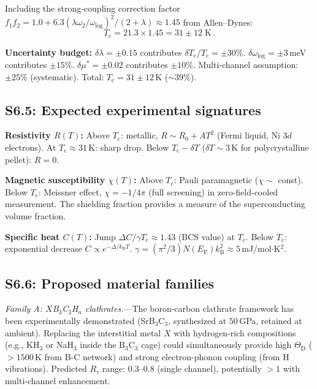 \documentclass[prb,twocolumn,superscriptaddress,longbibliography,floatfix]{revtex4-2}
\newcommand{\kB}{k_{\mathrm{B}}}
\newcommand{\tauasym}{\tau}
\newcommand{\Rtau}{R_{\tauasym}}
\newcommand{\Tc}{T_{\mathrm{c}}}
\newcommand{\EF}{E_{\mathrm{F}}}
\newcommand{\ThetaD}{\Theta_{\mathrm{D}}}
\begin{document}
Including the strong-coupling correction factor
$f_1 f_2 = 1.0 + 6.3(\lambda\omega_2/\omega_{\log})^2/(2+\lambda)
\approx 1.45$ from Allen--Dynes:
\begin{equation}
  \boxed{\Tc = 21.3 \times 1.45 = 31 \pm 12\;\text{K}\,.}
\end{equation}

\textbf{Uncertainty budget:}
$\delta\lambda = \pm 0.15$ contributes $\delta\Tc/\Tc = \pm 30\%$.
$\delta\omega_{\log} = \pm 3\,$meV contributes $\pm 15\%$.
$\delta\mu^* = \pm 0.02$ contributes $\pm 10\%$.
Multi-channel assumption: $\pm 25\%$ (systematic).
Total: $\Tc = 31 \pm 12\,$K ($\sim 39\%$).

\subsection{S6.5: Expected experimental signatures}

\textbf{Resistivity $R(T)$:}
Above $\Tc$: metallic, $R \sim R_0 + AT^2$ (Fermi liquid,
Ni $3d$ electrons).  At $\Tc \approx 31\,$K: sharp drop.
Below $\Tc - \delta T$ ($\delta T \sim 3\,$K for polycrystalline
pellet): $R = 0$.

\textbf{Magnetic susceptibility $\chi(T)$:}
Above $\Tc$: Pauli paramagnetic ($\chi \sim$ const).
Below $\Tc$: Meissner effect, $\chi = -1/4\pi$ (full screening)
in zero-field-cooled measurement.  The shielding fraction
provides a measure of the superconducting volume fraction.

\textbf{Specific heat $C(T)$:}
Jump $\Delta C/\gamma\Tc \approx 1.43$ (BCS value) at $\Tc$.
Below $\Tc$: exponential decrease $C \propto e^{-\Delta/\kB T}$.
$\gamma = (\pi^2/3) N(\EF) \kB^2 \approx 5\,$mJ/mol$\cdot$K$^2$.

\subsection{S6.6: Proposed material families}

\emph{Family A: $X$B$_3$C$_3$H$_n$ clathrates.}---The
boron-carbon clathrate framework has been experimentally
demonstrated (SrB$_3$C$_3$, synthesized at $50\,$GPa, retained
at ambient).  Replacing the interstitial metal $X$ with
hydrogen-rich compositions (e.g., KH$_3$ or NaH$_3$ inside the
B$_3$C$_3$ cage) could simultaneously provide high $\ThetaD$
($> 1500\,$K from B-C network) and strong electron-phonon coupling
(from H vibrations).  Predicted $\Rtau$ range: $0.3$--$0.8$
(single channel), potentially $> 1$ with multi-channel
enhancement.
\end{document}
